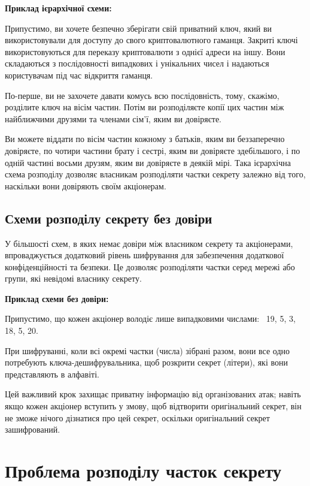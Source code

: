 \textbf{Приклад ієрархічної схеми:} \par
Припустимо, ви хочете безпечно зберігати свій приватний ключ, який ви використовували для доступу до свого криптовалютного гаманця.
Закриті ключі використовуються для переказу криптовалюти з однієї адреси на іншу. Вони складаються з послідовності випадкових і унікальних чисел і надаються користувачам під час відкриття гаманця.

По-перше, ви не захочете давати комусь всю послідовність, тому, скажімо, розділите ключ на вісім частин. Потім ви розподіляєте копії цих частин між найближчими друзями та членами сім'ї, яким ви довіряєте.

Ви можете віддати по вісім частин кожному з батьків, яким ви беззаперечно довіряєте, по чотири частини брату і сестрі, яким ви довіряєте здебільшого, і по одній частині восьми друзям, яким ви довіряєте в деякій мірі. Така ієрархічна схема розподілу дозволяє власникам розподіляти частки секрету залежно від того, наскільки вони довіряють своїм акціонерам.

\subsection{Схеми розподілу секрету без довіри}
У більшості схем, в яких немає довіри між власником секрету та акціонерами, впроваджується додатковий рівень шифрування для забезпечення додаткової конфіденційності та безпеки. Це дозволяє розподіляти частки серед мережі або групи, які невідомі власнику секрету.

\vspace{0.25cm}
\textbf{Приклад схеми без довіри:}\par
Припустимо, що кожен акціонер володіє лише випадковими числами:~ 19, 5, 3, 18, 5, 20.

При шифруванні, коли всі окремі частки (числа) зібрані разом, вони все одно потребують ключа-дешифрувальника, щоб розкрити секрет (літери), які вони представляють в алфавіті.

Цей важливий крок захищає приватну інформацію від організованих атак; навіть якщо кожен акціонер вступить у змову, щоб відтворити оригінальний секрет, він не зможе нічого дізнатися про цей секрет, оскільки оригінальний секрет зашифрований.

\section{Проблема розподілу часток секрету}

